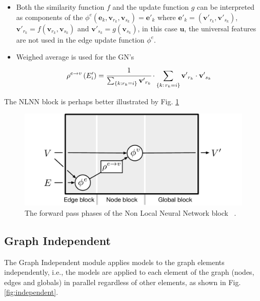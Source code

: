 \begin{itemize}

    \item Both the similarity function $f$ and the update function $g$ can be interpreted as components of the $\phi^e\left(\mathbf{e}_k, \mathbf{v}_{r_k}, \mathbf{v}_{s_k}\right) = \mathbf{e}'_k$  where $\mathbf{e}'_k = \left(\mathbf{v'}_{r_k}, \mathbf{v'}_{s_k} \right) $, $\mathbf{v'}_{r_k} = f\left(\mathbf{v}_{r_k}, \mathbf{v}_{s_k} \right)$ and $\mathbf{v'}_{s_k} =  g\left(\mathbf{v}_{s_k}\right)$, in this case $\mathbf{u}$, the universal features are not used in the edge update function $\phi^e$. 
    
    \item Weighed average is used for the GN’s 
    \begin{equation}
        \rho^{e \rightarrow v}
        \left( 
            E'_i 
        \right) 
        = \cfrac{1}{
            \sum_{
                \{ k : r_k = i \}
            } {
                \mathbf{v'}_{r_k}
            }
        }
        \cdot
        \sum_{\{k:\, r_k=i\}} \mathbf{v'}_{r_k} \cdot \mathbf{v'}_{s_k}
    \end{equation}

\end{itemize}

The NLNN block is perhaps better illustrated by Fig. \ref{fig:nlnn}

\begin{figure}[H]
    \centering
    \includegraphics[width=.7\textwidth]{fig/content/graph_nets/blocks/nlnn.pdf}
    \caption{The forward pass phases of the Non Local Neural Network block ~\cite{Battaglia_2018}.}
    \label{fig:nlnn}
\end{figure}



\subsection{Graph Independent}

The Graph Independent module applies models to the graph elements independently, i.e., the models are applied to each element of the graph (nodes, edges and globals) in parallel regardless of other elements, as shown in Fig.\ref{fig:independent}.

